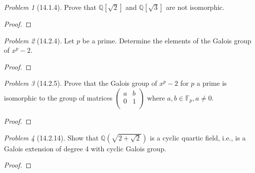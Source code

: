 \documentclass[10pt]{article}
\newcommand{\sk}{\vskip 10mm}
\newcommand{\bb}[1]{\mathbb{#1}}
\theoremstyle{remark}
\newtheorem{problem}{Problem}
\theoremstyle{remark}
\begin{document}
\begin{problem}[14.1.4]
  Prove that $\bb{Q}[\sqrt{2}]$ and $\bb{Q}[\sqrt{3}]$ are not isomorphic.
\end{problem}

\begin{proof}
  
\end{proof}

\sk

\begin{problem}[14.2.4]
  Let $p$ be a prime. Determine the elements of the Galois group of $x^p-2$.
\end{problem}

\begin{proof}
  
\end{proof}

\sk

\begin{problem}[14.2.5]
  Prove that the Galois group of $x^p-2$ for $p$ a prime is isomorphic to
  the group of matrices $\left(\begin{array}{cc}a&b\\0&1\\ \end{array}\right)$
  where $a,b\in\bb{F}_p,a\neq 0$.
\end{problem}

\begin{proof}
  
\end{proof}

\sk

\begin{problem}[14.2.14]
  Show that $\bb{Q}(\sqrt{2+\sqrt{2}})$ is a cyclic quartic field,
  i.e., is a Galois extension of degree 4 with cyclic Galois group.
\end{problem}

\begin{proof}
  
\end{proof}

\sk

\end{document}
